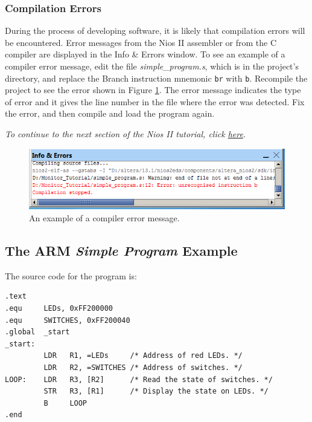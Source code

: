 \documentclass[11pt, twoside, pdftex]{article}
\begin{document}
\subsubsection{Compilation Errors}

During the process of developing software, it is likely that compilation errors will be 
encountered. Error messages from the Nios II assembler or from
the C compiler are displayed in the \textsf{Info \& Errors}
window. To see an example of a compiler error message, edit
the file {\it simple\_program.s}, which is in the project's directory, and replace the Branch instruction mnemonic 
\texttt {br} with \texttt {b}.
Recompile the project to see the error shown in Figure \ref{fig:AMP_compilererror_nios}. 
The error message indicates the type of error and it gives the
line number in the file where the error was detected. Fix the
error, and then compile and load the program again.

{\it To continue to the next section of the Nios II tutorial, click \hyperref[tut:nios_3]{here}.}

\begin{figure}[H]
   \begin{center}
      \includegraphics[scale=1]{screenshots/figure16.png}
   \end{center}
   \caption{An example of a compiler error message.} 
   \label{fig:AMP_compilererror_nios}
\end{figure}

\subsection{The ARM {\it Simple Program} Example}
\label{tut:arm_1}

The source code for the program is:

\begin{lstlisting}[style=defaultArmStyle, xleftmargin=3cm]
.text
.equ     LEDs, 0xFF200000
.equ     SWITCHES, 0xFF200040
.global  _start
_start:
         LDR   R1, =LEDs     /* Address of red LEDs. */
         LDR   R2, =SWITCHES /* Address of switches. */
LOOP:    LDR   R3, [R2]      /* Read the state of switches. */
         STR   R3, [R1]      /* Display the state on LEDs. */
         B     LOOP
.end
\end{lstlisting}
\end{document}

